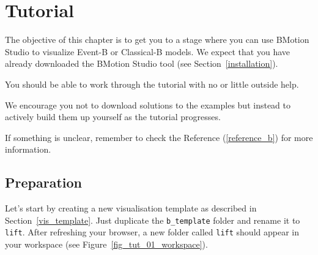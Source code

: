 \section{Tutorial}
\label{tutorial_b}

The objective of this chapter is to get you to a stage where you can use BMotion Studio to visualize Event-B or Classical-B models. 
We expect that you have already downloaded the BMotion Studio tool (see Section~\ref{installation}).
 
You should be able to work through the tutorial with no or little outside help.

We encourage you not to download solutions to the examples but instead to actively build them up yourself as the tutorial progresses.

If something is unclear, remember to check the Reference (\ref{reference_b}) for more information.

\subsection{Preparation}

Let's start by creating a new visualisation template as described in Section~\ref{vis_template}.
Just duplicate the \texttt{b\_template} folder and rename it to \texttt{lift}.
After refreshing your browser, a new folder called \texttt{lift} should appear in your workspace (see Figure~\ref{fig_tut_01_workspace}).

